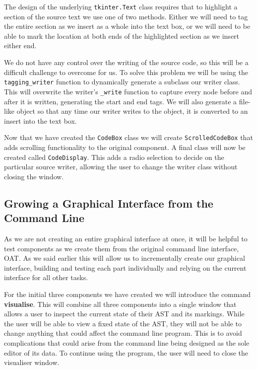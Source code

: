 \documentclass[twoside,a4paper]{report}
\begin{document}
The design of the underlying \texttt{tkinter.Text} class requires that to highlight a section of the source text we use one of two methods. Either we will
need to tag the entire section as we insert as a whole into the text box, or we will need to be able to mark the location at both ends of the highlighted
section as we insert either end.

We do not have any control over the writing of the source code, so this will be a difficult challenge to overcome for us. To solve this problem we will be
using the \texttt{tagging\_writer} function to dynamically generate a subclass our writer class. This will overwrite the writer's \texttt{\_write} function
to capture every node before and after it is written, generating the start and end tags. We will also generate a file-like object so that any time our writer
writes to the object, it is converted to an insert into the text box.

Now that we have created the \texttt{CodeBox} class we will create \texttt{ScrolledCodeBox} that adds scrolling functionality to the original component.
A final class will now be created called \texttt{CodeDisplay}. This adds a radio selection to decide on the particular source writer, allowing the user
to change the writer class without closing the window.

\subsection{Growing a Graphical Interface from the Command Line}

As we are not creating an entire graphical interface at once, it will be helpful to test components as we create them from the original command
line interface, OAT. As we said earlier this will allow us to incrementally create our graphical interface, building and testing each part individually
and relying on the current interface for all other tasks.

For the initial three components we have created we will introduce the command \textbf{visualise}. This will combine all three components into a single
window that allows a user to inspect the current state of their AST and its markings. While the user will be able to view a fixed state of the AST, they
will not be able to change anything that could affect the command line program. This is to avoid complications that could arise from the command line
being designed as the sole editor of its data. To continue using the program, the user will need to close the visualiser window.
\end{document}
